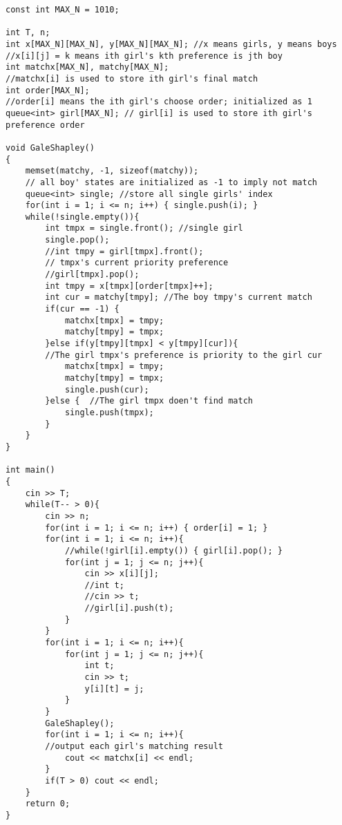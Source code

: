 \begin{lstlisting}
const int MAX_N = 1010;

int T, n;
int x[MAX_N][MAX_N], y[MAX_N][MAX_N]; //x means girls, y means boys
//x[i][j] = k means ith girl's kth preference is jth boy
int matchx[MAX_N], matchy[MAX_N];
//matchx[i] is used to store ith girl's final match
int order[MAX_N];
//order[i] means the ith girl's choose order; initialized as 1
queue<int> girl[MAX_N]; // girl[i] is used to store ith girl's preference order

void GaleShapley()
{
    memset(matchy, -1, sizeof(matchy));
    // all boy' states are initialized as -1 to imply not match
    queue<int> single; //store all single girls' index
    for(int i = 1; i <= n; i++) { single.push(i); }
    while(!single.empty()){
        int tmpx = single.front(); //single girl
        single.pop();
        //int tmpy = girl[tmpx].front();
        // tmpx's current priority preference
        //girl[tmpx].pop();
        int tmpy = x[tmpx][order[tmpx]++];
        int cur = matchy[tmpy]; //The boy tmpy's current match
        if(cur == -1) {
            matchx[tmpx] = tmpy;
            matchy[tmpy] = tmpx;
        }else if(y[tmpy][tmpx] < y[tmpy][cur]){
        //The girl tmpx's preference is priority to the girl cur
            matchx[tmpx] = tmpy;
            matchy[tmpy] = tmpx;
            single.push(cur);
        }else {  //The girl tmpx doen't find match
            single.push(tmpx);
        }
    }
}

int main()
{
    cin >> T;
    while(T-- > 0){
        cin >> n;
        for(int i = 1; i <= n; i++) { order[i] = 1; }
        for(int i = 1; i <= n; i++){
            //while(!girl[i].empty()) { girl[i].pop(); }
            for(int j = 1; j <= n; j++){
                cin >> x[i][j];
                //int t;
                //cin >> t;
                //girl[i].push(t);
            }
        }
        for(int i = 1; i <= n; i++){
            for(int j = 1; j <= n; j++){
                int t;
                cin >> t;
                y[i][t] = j;
            }
        }
        GaleShapley();
        for(int i = 1; i <= n; i++){
        //output each girl's matching result
            cout << matchx[i] << endl;
        }
        if(T > 0) cout << endl;
    }
    return 0;
}
\end{lstlisting}


